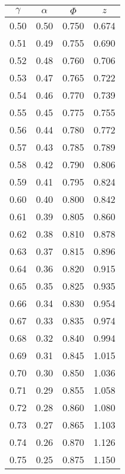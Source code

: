 \begin{tabular}{|c|c|c|c|}\hline
$\gamma$ & $\alpha$ & $\Phi$ & $z$ \\ \hline
0.50 & 0.50 & 0.750 & 0.674\\
0.51 & 0.49 & 0.755 & 0.690\\
0.52 & 0.48 & 0.760 & 0.706\\
0.53 & 0.47 & 0.765 & 0.722\\
0.54 & 0.46 & 0.770 & 0.739\\
0.55 & 0.45 & 0.775 & 0.755\\
0.56 & 0.44 & 0.780 & 0.772\\
0.57 & 0.43 & 0.785 & 0.789\\
0.58 & 0.42 & 0.790 & 0.806\\
0.59 & 0.41 & 0.795 & 0.824\\
0.60 & 0.40 & 0.800 & 0.842\\
0.61 & 0.39 & 0.805 & 0.860\\
0.62 & 0.38 & 0.810 & 0.878\\
0.63 & 0.37 & 0.815 & 0.896\\
0.64 & 0.36 & 0.820 & 0.915\\
0.65 & 0.35 & 0.825 & 0.935\\
0.66 & 0.34 & 0.830 & 0.954\\
0.67 & 0.33 & 0.835 & 0.974\\
0.68 & 0.32 & 0.840 & 0.994\\
0.69 & 0.31 & 0.845 & 1.015\\
0.70 & 0.30 & 0.850 & 1.036\\
0.71 & 0.29 & 0.855 & 1.058\\
0.72 & 0.28 & 0.860 & 1.080\\
0.73 & 0.27 & 0.865 & 1.103\\
0.74 & 0.26 & 0.870 & 1.126\\
0.75 & 0.25 & 0.875 & 1.150\\
\hline \end{tabular}

\columnbreak

